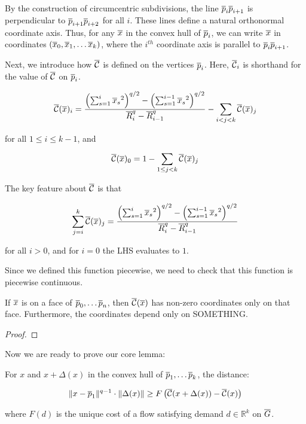 By the construction of circumcentric subdivisions, 
the line $\overline{p}_{i}\overline{p}_{i+1}$ is perpendicular to
$\overline{p}_{i+1}\overline{p}_{i+2}$ for all $i$. These lines define a natural
orthonormal coordinate axis. Thus,
for any $\overline{x}$ in the convex hull of $\overline{p}_i$, we can write $\overline{x}$ in
coordinates $(\overline{x}_0, \overline{x}_1, \ldots \overline{x}_k)$, where the $i^{th}$ coordinate
axis is parallel to $\overline{p}_i \overline{p}_{i+1}$.

Next, we introduce how $\overline{\mathcal{C}}$ is defined on the vertices $\overline{p}_{i}$. Here,
$\overline{\mathcal{C}}_i$ is shorthand for the value of $\overline{\mathcal{C}}$ on $\overline{p}_{i}$.

\begin{align}
\overline{\mathcal{C}}(\overline{x})_i = \frac{
\left(\sum_{s=1}^i {\overline{x}_s}^2\right)^{q/2} -\left(\sum_{s=1}^{i-1}
{\overline{x}_s}^2\right)^{q/2}
}
{
\overline{R}_i^q - \overline{R}_{i-1}^q
} - \sum_{i < j < k} \overline{\mathcal{C}}(\overline{x})_j
\end{align}

for all $1 \leq i \leq k-1$, and

\[ \overline{\mathcal{C}}(\overline{x})_0 = 1 - \sum_{1 \leq j < k} \overline{\mathcal{C}}(\overline{x})_j
\]

The key feature about $\overline{\mathcal{C}}$ is that

\[\sum_{j=i}^k \overline{\mathcal{C}}(\overline{x})_j= \frac{
\left(\sum_{s=1}^i {\overline{x}_s}^2\right)^{q/2} -\left(\sum_{s=1}^{i-1}
{\overline{x}_s}^2\right)^{q/2}
}
{
\overline{R}_i^q - \overline{R}_{i-1}^q
}\]

for all $i > 0$, and for $i = 0$ the LHS evaluates to $1$.

Since we defined this function piecewise, we need to check that this
function is piecewise continuous.

\begin{lemma} If $\overline{x}$ is on a face of $\overline{p}_0, \ldots \overline{p}_n$, then
$\overline{\mathcal{C}}(\overline{x})$ has non-zero coordinates only on that face. Furthermore, the
coordinates depend only on SOMETHING.

\end{lemma}

\begin{proof}

\end{proof}

Now we are ready to prove our core lemma:

\begin{lemma} For $x$ and $x+\Delta(x)$ in the convex hull of $\overline{p}_1,
\ldots \overline{p}_k$, the distance:

\[ \|x-\overline{p}_1\|^{q-1} \cdot \|\Delta(x)\| \geq
F\left(\overline{\mathcal{C}}(x+\Delta(x))-\overline{\mathcal{C}}(x)\right)\]

where $F(d)$ is the unique cost of a flow satisfying demand $d \in
\mathbb{R}^k$ on $\overline{G}$.

\end{lemma}

